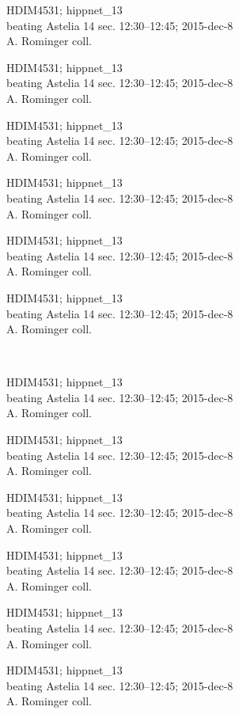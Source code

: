 \documentclass[2pt]{extarticle}
\begin{document}
\noindent
\parbox{0.16\textwidth}{\tiny \raggedright \rule[-0.3\baselineskip]{0pt}{10pt}HDIM4531; hippnet\_13\\ beating Astelia 14 sec. 12:30--12:45; 2015-dec-8\\ A. Rominger coll.}
\parbox{0.16\textwidth}{\tiny \raggedright \rule[-0.3\baselineskip]{0pt}{10pt}HDIM4531; hippnet\_13\\ beating Astelia 14 sec. 12:30--12:45; 2015-dec-8\\ A. Rominger coll.}
\parbox{0.16\textwidth}{\tiny \raggedright \rule[-0.3\baselineskip]{0pt}{10pt}HDIM4531; hippnet\_13\\ beating Astelia 14 sec. 12:30--12:45; 2015-dec-8\\ A. Rominger coll.}
\parbox{0.16\textwidth}{\tiny \raggedright \rule[-0.3\baselineskip]{0pt}{10pt}HDIM4531; hippnet\_13\\ beating Astelia 14 sec. 12:30--12:45; 2015-dec-8\\ A. Rominger coll.}
\parbox{0.16\textwidth}{\tiny \raggedright \rule[-0.3\baselineskip]{0pt}{10pt}HDIM4531; hippnet\_13\\ beating Astelia 14 sec. 12:30--12:45; 2015-dec-8\\ A. Rominger coll.}
\parbox{0.16\textwidth}{\tiny \raggedright \rule[-0.3\baselineskip]{0pt}{10pt}HDIM4531; hippnet\_13\\ beating Astelia 14 sec. 12:30--12:45; 2015-dec-8\\ A. Rominger coll.} \\ 
\vspace{0.001in} 

\noindent
\parbox{0.16\textwidth}{\tiny \raggedright \rule[-0.3\baselineskip]{0pt}{10pt}HDIM4531; hippnet\_13\\ beating Astelia 14 sec. 12:30--12:45; 2015-dec-8\\ A. Rominger coll.}
\parbox{0.16\textwidth}{\tiny \raggedright \rule[-0.3\baselineskip]{0pt}{10pt}HDIM4531; hippnet\_13\\ beating Astelia 14 sec. 12:30--12:45; 2015-dec-8\\ A. Rominger coll.}
\parbox{0.16\textwidth}{\tiny \raggedright \rule[-0.3\baselineskip]{0pt}{10pt}HDIM4531; hippnet\_13\\ beating Astelia 14 sec. 12:30--12:45; 2015-dec-8\\ A. Rominger coll.}
\parbox{0.16\textwidth}{\tiny \raggedright \rule[-0.3\baselineskip]{0pt}{10pt}HDIM4531; hippnet\_13\\ beating Astelia 14 sec. 12:30--12:45; 2015-dec-8\\ A. Rominger coll.}
\parbox{0.16\textwidth}{\tiny \raggedright \rule[-0.3\baselineskip]{0pt}{10pt}HDIM4531; hippnet\_13\\ beating Astelia 14 sec. 12:30--12:45; 2015-dec-8\\ A. Rominger coll.}
\parbox{0.16\textwidth}{\tiny \raggedright \rule[-0.3\baselineskip]{0pt}{10pt}HDIM4531; hippnet\_13\\ beating Astelia 14 sec. 12:30--12:45; 2015-dec-8\\ A. Rominger coll.} \\ 
\vspace{0.001in} 
\end{document}
